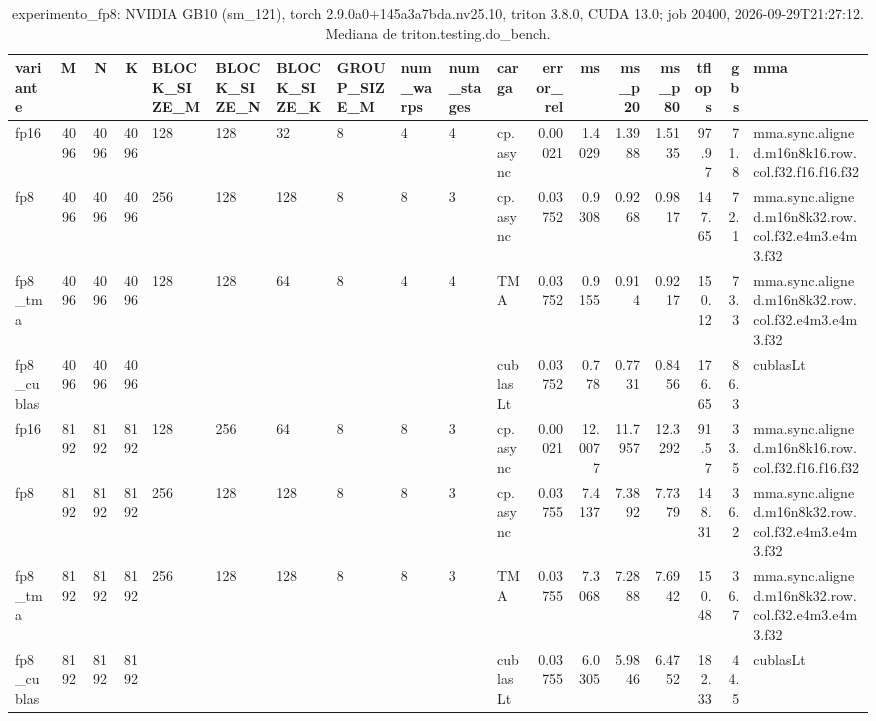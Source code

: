 \begin{table}[htbp]
  \centering\small
  \begin{tabular}{lrrrlllllllrrrrrrl}
    \toprule
    variante & M & N & K & BLOCK\_SIZE\_M & BLOCK\_SIZE\_N & BLOCK\_SIZE\_K & GROUP\_SIZE\_M & num\_warps & num\_stages & carga & error\_rel & ms & ms\_p20 & ms\_p80 & tflops & gbs & mma \\
    \midrule
    fp16 & 4096 & 4096 & 4096 & 128 & 128 & 32 & 8 & 4 & 4 & cp.async & 0.00021 & 1.4029 & 1.3988 & 1.5135 & 97.97 & 71.8 & mma.sync.aligned.m16n8k16.row.col.f32.f16.f16.f32 \\
    fp8 & 4096 & 4096 & 4096 & 256 & 128 & 128 & 8 & 8 & 3 & cp.async & 0.03752 & 0.9308 & 0.9268 & 0.9817 & 147.65 & 72.1 & mma.sync.aligned.m16n8k32.row.col.f32.e4m3.e4m3.f32 \\
    fp8\_tma & 4096 & 4096 & 4096 & 128 & 128 & 64 & 8 & 4 & 4 & TMA & 0.03752 & 0.9155 & 0.914 & 0.9217 & 150.12 & 73.3 & mma.sync.aligned.m16n8k32.row.col.f32.e4m3.e4m3.f32 \\
    fp8\_cublas & 4096 & 4096 & 4096 &  &  &  &  &  &  & cublasLt & 0.03752 & 0.778 & 0.7731 & 0.8456 & 176.65 & 86.3 & cublasLt \\
    fp16 & 8192 & 8192 & 8192 & 128 & 256 & 64 & 8 & 8 & 3 & cp.async & 0.00021 & 12.0077 & 11.7957 & 12.3292 & 91.57 & 33.5 & mma.sync.aligned.m16n8k16.row.col.f32.f16.f16.f32 \\
    fp8 & 8192 & 8192 & 8192 & 256 & 128 & 128 & 8 & 8 & 3 & cp.async & 0.03755 & 7.4137 & 7.3892 & 7.7379 & 148.31 & 36.2 & mma.sync.aligned.m16n8k32.row.col.f32.e4m3.e4m3.f32 \\
    fp8\_tma & 8192 & 8192 & 8192 & 256 & 128 & 128 & 8 & 8 & 3 & TMA & 0.03755 & 7.3068 & 7.2888 & 7.6942 & 150.48 & 36.7 & mma.sync.aligned.m16n8k32.row.col.f32.e4m3.e4m3.f32 \\
    fp8\_cublas & 8192 & 8192 & 8192 &  &  &  &  &  &  & cublasLt & 0.03755 & 6.0305 & 5.9846 & 6.4752 & 182.33 & 44.5 & cublasLt \\
    \bottomrule
  \end{tabular}
  \caption{experimento\_fp8: NVIDIA GB10 (sm\_121), torch 2.9.0a0+145a3a7bda.nv25.10, triton 3.8.0, CUDA 13.0; job 20400, 2026-09-29T21:27:12. Mediana de triton.testing.do\_bench.}
  \label{tab:experimento-fp8}
\end{table}

